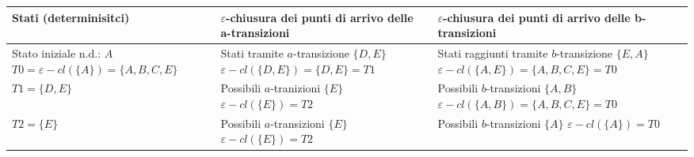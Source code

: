 \documentclass{standalone}
\providecommand\lightrule{%
	\arrayrulecolor{black!30}%
	\midrule[\lightrulewidth]%
	\arrayrulecolor{black}}
\begin{document}
\begin{tabularx}{\textwidth}{XXX}
		Stati (determinisitci) & \(\varepsilon\)-chiusura dei punti di arrivo delle a-transizioni & \(\varepsilon\)-chiusura dei punti di arrivo delle b-transizioni \\
    \midrule
        Stato iniziale n.d.: \(A\) \newline
        \(T0 = \varepsilon-cl(\{A\}) = \{A, B, C, E\}\)
        &
        Stati tramite \(a\)-transizione \(\{D,E\}\) \newline
        \(\varepsilon-cl(\{D,E\}) = \{D,E\} = T1\) \newline
        [T1 unmarked]
        &
        Stati raggiunti tramite \(b\)-transizione \(\{E, A\}\) \newline
        \(\varepsilon-cl(\{A,E\}) = \{A,B,C,E\} = T0\) 
        \\ \lightrule
        \(T1 = \{D,E\}\)
        &
        Possibili \(a\)-tranizioni \(\{E\}\) \newline
        \(\varepsilon-cl(\{E\}) = T2\) \newline
        [T2 unmarked]
        &
        Possibili \(b\)-transizioni \(\{A,B\}\) \newline
        \(\varepsilon-cl(\{A,B\}) = \{A, B, C, E\} = T0\) 
        \\ \lightrule
        \(T2 = \{E\}\)
        &
        Possibili \(a\)-transizioni \(\{E\}\)
        \(\varepsilon-cl(\{E\}) = T2\)
        &
        Possibili \(b\)-transizioni \(\{A\}\)
        \(\varepsilon-cl(\{A\}) = T0\)
        \\
\end{tabularx}
\end{document}
